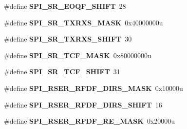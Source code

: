 \begin{DoxyCompactItemize}
\item 
\#define {\bfseries S\+P\+I\+\_\+\+S\+R\+\_\+\+E\+O\+Q\+F\+\_\+\+S\+H\+I\+FT}~28\hypertarget{group__SPI__Register__Masks_ga0395371ab4e76da4f99c89bc6963e816}{}\label{group__SPI__Register__Masks_ga0395371ab4e76da4f99c89bc6963e816}

\item 
\#define {\bfseries S\+P\+I\+\_\+\+S\+R\+\_\+\+T\+X\+R\+X\+S\+\_\+\+M\+A\+SK}~0x40000000u\hypertarget{group__SPI__Register__Masks_ga82001e6d6fa1c1e51ab330a4d6b209c5}{}\label{group__SPI__Register__Masks_ga82001e6d6fa1c1e51ab330a4d6b209c5}

\item 
\#define {\bfseries S\+P\+I\+\_\+\+S\+R\+\_\+\+T\+X\+R\+X\+S\+\_\+\+S\+H\+I\+FT}~30\hypertarget{group__SPI__Register__Masks_ga596b82d7dd4fe7f24ea66c19a9413b96}{}\label{group__SPI__Register__Masks_ga596b82d7dd4fe7f24ea66c19a9413b96}

\item 
\#define {\bfseries S\+P\+I\+\_\+\+S\+R\+\_\+\+T\+C\+F\+\_\+\+M\+A\+SK}~0x80000000u\hypertarget{group__SPI__Register__Masks_ga3142ac7389c847b78c8f42e6bad5eec1}{}\label{group__SPI__Register__Masks_ga3142ac7389c847b78c8f42e6bad5eec1}

\item 
\#define {\bfseries S\+P\+I\+\_\+\+S\+R\+\_\+\+T\+C\+F\+\_\+\+S\+H\+I\+FT}~31\hypertarget{group__SPI__Register__Masks_ga4edd10f93f07c7b2edfbac31c1d4ebf5}{}\label{group__SPI__Register__Masks_ga4edd10f93f07c7b2edfbac31c1d4ebf5}

\item 
\#define {\bfseries S\+P\+I\+\_\+\+R\+S\+E\+R\+\_\+\+R\+F\+D\+F\+\_\+\+D\+I\+R\+S\+\_\+\+M\+A\+SK}~0x10000u\hypertarget{group__SPI__Register__Masks_ga10709e9e15464e94d63f2034df58cd32}{}\label{group__SPI__Register__Masks_ga10709e9e15464e94d63f2034df58cd32}

\item 
\#define {\bfseries S\+P\+I\+\_\+\+R\+S\+E\+R\+\_\+\+R\+F\+D\+F\+\_\+\+D\+I\+R\+S\+\_\+\+S\+H\+I\+FT}~16\hypertarget{group__SPI__Register__Masks_ga1abe68cebab13a4018f43162098e4cd6}{}\label{group__SPI__Register__Masks_ga1abe68cebab13a4018f43162098e4cd6}

\item 
\#define {\bfseries S\+P\+I\+\_\+\+R\+S\+E\+R\+\_\+\+R\+F\+D\+F\+\_\+\+R\+E\+\_\+\+M\+A\+SK}~0x20000u\hypertarget{group__SPI__Register__Masks_ga5b78af7a1292fc0e0b4b39a92a4140b2}{}\label{group__SPI__Register__Masks_ga5b78af7a1292fc0e0b4b39a92a4140b2}


\end{DoxyCompactItemize}
